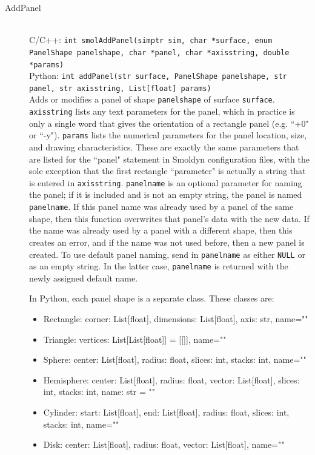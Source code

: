 \documentclass {book}
\newcommand {\ttt} {\texttt}
\begin{document}
\begin{description}
\item[AddPanel]
\hfill \\
C/C++: \ttt{int smolAddPanel(simptr sim, char *surface, enum PanelShape panelshape, char *panel, char *axisstring, double *params)}\\
Python: \ttt{int addPanel(str surface, PanelShape panelshape, str panel, str axisstring, List[float] params)}\\
Adds or modifies a panel of shape \ttt{panelshape} of surface \ttt{surface}. \ttt{axisstring} lists any text parameters for the panel, which in practice is only a single word that gives the orientation of a rectangle panel (e.g. ``+0" or ``-y"). \ttt{params} lists the numerical parameters for the panel location, size, and drawing characteristics. These are exactly the same parameters that are listed for the ``panel" statement in Smoldyn configuration files, with the sole exception that the first rectangle ``parameter" is actually a string that is entered in \ttt{axisstring}. \ttt{panelname} is an optional parameter for naming the panel; if it is included and is not an empty string, the panel is named \ttt{panelname}. If this panel name was already used by a panel of the same shape, then this function overwrites that panel's data with the new data. If the name was already used by a panel with a different shape, then this creates an error, and if the name was not used before, then a new panel is created. To use default panel naming, send in \ttt{panelname} as either \ttt{NULL} or as an empty string. In the latter case, \ttt{panelname} is returned with the newly assigned default name.

In Python, each panel shape is a separate class. These classes are:
\begin{itemize}
\item Rectangle: corner: List[float], dimensions: List[float], axis: str, name=""
\item Triangle: vertices: List[List[float]] = [[]], name=""
\item Sphere: center: List[float], radius: float, slices: int, stacks: int, name=""
\item Hemisphere: center: List[float], radius: float, vector: List[float], slices: int, stacks: int, name: str = ""
\item Cylinder: start: List[float], end: List[float], radius: float, slices: int, stacks: int, name=""
\item Disk: center: List[float], radius: float, vector: List[float], name=""
\end{itemize}


\end{description}
\end{document}
